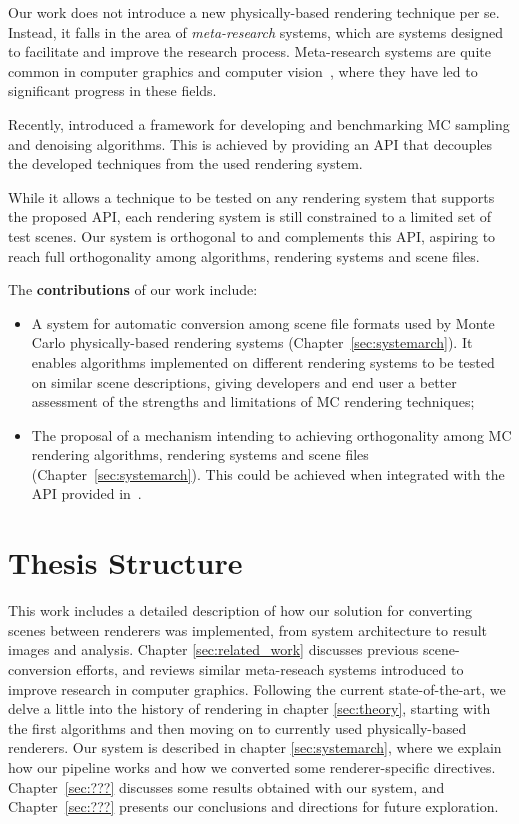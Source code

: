 Our work does not introduce a new physically-based rendering technique per se. Instead, it falls in the area of {\it meta-research} systems, which are systems 
designed to facilitate and improve the research process. Meta-research systems are quite common in computer graphics and computer vision~\cite{MiddleburyStereo, MiddleburyFlow, AlphaMatting, VideoMatting}, where they have led to significant progress in these fields. 
  
Recently, \cite{Santos:2018:FBKSD} introduced a framework for developing and benchmarking MC sampling and denoising algorithms. This is achieved by providing an API that decouples the developed techniques from the used rendering system. 

While it allows a technique to be tested on any rendering system that supports the proposed API, each rendering system is still constrained to a limited set of test scenes. Our system is orthogonal to and complements this API, aspiring to reach full orthogonality among algorithms, rendering systems and scene files.

The {\bf contributions} of our work include:
\begin{itemize}
	\item A system for automatic conversion among scene file formats used by Monte Carlo physically-based rendering systems (Chapter~\ref{sec:systemarch}).
	It enables algorithms implemented on different rendering systems to be tested on similar scene descriptions, giving developers and end user a better 
assessment of the strengths and limitations of MC rendering techniques;
	\item The proposal of a mechanism intending to achieving orthogonality among MC rendering algorithms, rendering systems and scene files (Chapter~\ref{sec:systemarch}). 
This could be achieved when integrated with the API provided in~\cite{Santos:2018:FBKSD}. 
\end{itemize}

\section{Thesis Structure}

This work includes a detailed description of how our solution for converting scenes between renderers was implemented, from system architecture to result images and analysis. Chapter \ref{sec:related_work} discusses previous scene-conversion efforts, and reviews 
similar meta-reseach systems introduced to improve research in computer graphics.
Following the current state-of-the-art, we delve a little into the history of rendering in chapter \ref{sec:theory}, starting with the first algorithms and then moving on to currently used physically-based renderers.
%
Our system is described in chapter \ref{sec:systemarch}, where we explain how our pipeline works and how we converted some renderer-specific directives. Chapter~\ref{sec:???} discusses some results obtained with our system, and  Chapter~\ref{sec:???} presents our conclusions and directions for future exploration.


